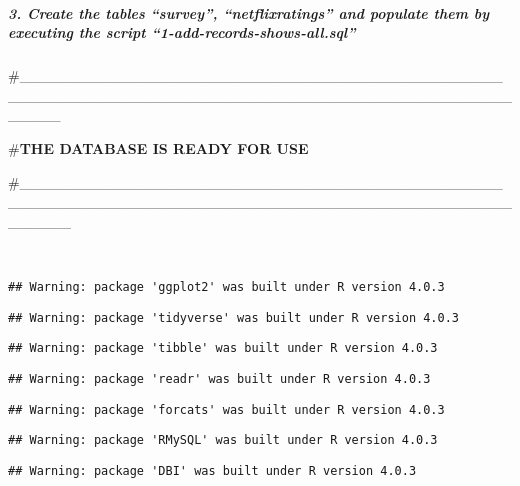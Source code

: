 \documentclass[
]{article}
\begin{document}
\hypertarget{create-the-tables-survey-netflixratings-and-populate-them-by-executing-the-script-1-add-records-shows-all.sql}{%
\subparagraph{\texorpdfstring{3. Create the tables \textbf{``survey''},
\textbf{``netflixratings''} and populate them by executing the script
\textbf{``1-add-records-shows-all.sql''}}{3. Create the tables ``survey'', ``netflixratings'' and populate them by executing the script ``1-add-records-shows-all.sql''}}\label{create-the-tables-survey-netflixratings-and-populate-them-by-executing-the-script-1-add-records-shows-all.sql}}

\#\_\_\_\_\_\_\_\_\_\_\_\_\_\_\_\_\_\_\_\_\_\_\_\_\_\_\_\_\_\_\_\_\_\_\_\_\_\_\_\_\_\_\_\_\_\_\_\_\_\_\_\_\_\_\_\_\_\_\_\_\_\_\_\_\_\_\_\_\_\_\_\_\_\_\_\_\_\_\_\_\_\_\_\_\_\_\_\_\_\_\_\_\_\_\_\_\_\_\_

\#\textbf{THE DATABASE IS READY FOR USE}

\#\_\_\_\_\_\_\_\_\_\_\_\_\_\_\_\_\_\_\_\_\_\_\_\_\_\_\_\_\_\_\_\_\_\_\_\_\_\_\_\_\_\_\_\_\_\_\_\_\_\_\_\_\_\_\_\_\_\_\_\_\_\_\_\_\_\_\_\_\_\_\_\_\_\_\_\_\_\_\_\_\_\_\_\_\_\_\_\_\_\_\_\_\_\_\_\_\_\_\_\_

~

\begin{verbatim}
## Warning: package 'ggplot2' was built under R version 4.0.3
\end{verbatim}

\begin{verbatim}
## Warning: package 'tidyverse' was built under R version 4.0.3
\end{verbatim}

\begin{verbatim}
## Warning: package 'tibble' was built under R version 4.0.3
\end{verbatim}

\begin{verbatim}
## Warning: package 'readr' was built under R version 4.0.3
\end{verbatim}

\begin{verbatim}
## Warning: package 'forcats' was built under R version 4.0.3
\end{verbatim}

\begin{verbatim}
## Warning: package 'RMySQL' was built under R version 4.0.3
\end{verbatim}

\begin{verbatim}
## Warning: package 'DBI' was built under R version 4.0.3
\end{verbatim}
\end{document}
